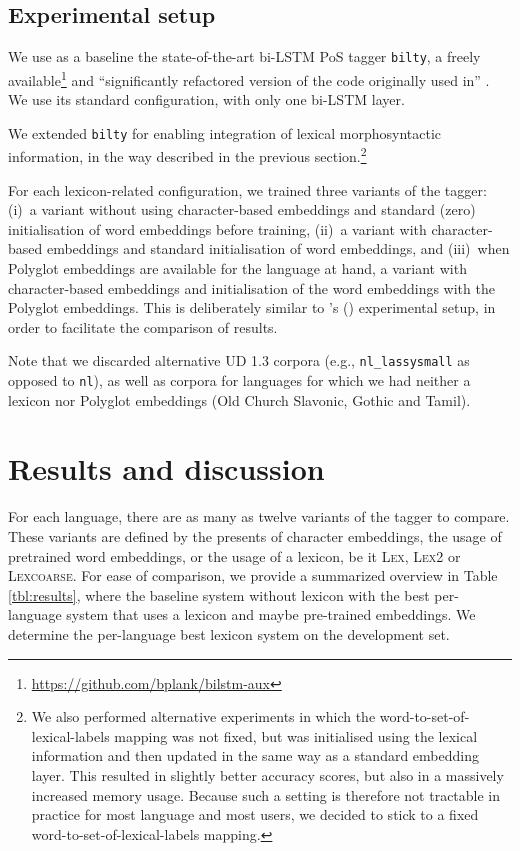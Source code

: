 \documentclass[11pt,letterpaper]{article}
\begin{document}
\subsection{Experimental setup}

We use as a baseline the state-of-the-art bi-LSTM PoS tagger \texttt{bilty}, a freely
available\footnote{\url{https://github.com/bplank/bilstm-aux}} and ``significantly refactored version of the code
originally used in'' \cite{plank16}. We use its standard configuration, with only one bi-LSTM layer.

We extended \texttt{bilty} for enabling integration of lexical morphosyntactic information, in the way described in the
previous section.\footnote{We also performed alternative experiments in which the word-to-set-of-lexical-labels mapping
  was not fixed, but was initialised using the lexical information and then updated in the same way as a standard
  embedding layer. This resulted in slightly better accuracy scores, but also in a massively increased memory
  usage. Because such a setting is therefore not tractable in practice for most language and most users, we decided to
  stick to a fixed word-to-set-of-lexical-labels mapping.}

For each lexicon-related configuration, we trained three variants of the tagger: (i)~a variant without using
character-based embeddings and standard (zero) initialisation of word embeddings before training, (ii)~a variant with
character-based embeddings and standard initialisation of word embeddings, and (iii)~when Polyglot embeddings are
available for the language at hand, a variant with character-based embeddings and initialisation of the word embeddings
with the Polyglot embeddings. This is deliberately similar to \citeauthor{plank16}'s (\citeyear{plank16}) experimental
setup, in order to facilitate the comparison of results.

Note that we discarded alternative UD 1.3 corpora (e.g., {\tt nl\_lassysmall} as opposed to {\tt nl}), as well as
corpora for languages for which we had neither a lexicon nor Polyglot embeddings (Old Church Slavonic, Gothic and Tamil).


\section{Results and discussion}

For each language, there are as many as twelve variants of the tagger to compare. These variants are defined by the presents of character embeddings, the usage of pretrained word embeddings, or the usage of a lexicon, be it \textsc{Lex}, \textsc{Lex2} or \textsc{Lexcoarse}. For ease of comparison, we provide a summarized overview in Table \ref{tbl:results}, where the baseline system without lexicon with the best per-language system that uses a lexicon and maybe pre-trained embeddings. We determine the per-language best lexicon system on the development set.
\end{document}
